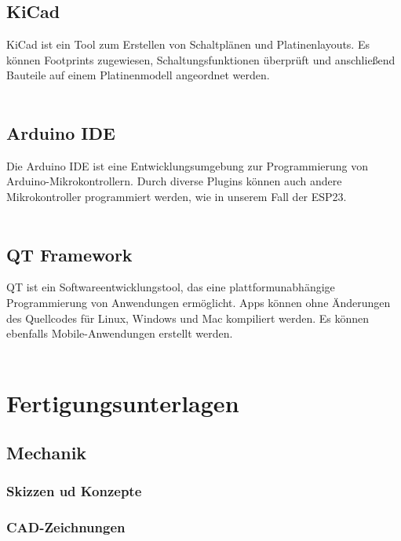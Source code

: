 \documentclass[titlepage,12pt,twoside]{article}
\begin{document}
\subsection{KiCad}
\label{chap:KiCad}
KiCad ist ein Tool zum Erstellen von Schaltplänen und Platinenlayouts. Es können Footprints zugewiesen, Schaltungsfunktionen überprüft und anschließend Bauteile auf einem Platinenmodell angeordnet werden. \\
\\
\subsection{Arduino IDE}
\label{chap:Arduino IDE}
Die Arduino IDE ist eine Entwicklungsumgebung zur Programmierung von Arduino-Mikrokontrollern. Durch diverse Plugins können auch andere Mikrokontroller programmiert werden, wie in unserem Fall der ESP23. \\
\\
\subsection{QT Framework}
\label{chap:QT Framework}
QT ist ein Softwareentwicklungstool, das eine plattformunabhängige Programmierung von Anwendungen ermöglicht. Apps können ohne Änderungen des Quellcodes für Linux, Windows und Mac kompiliert werden. Es können ebenfalls Mobile-Anwendungen
erstellt werden. \\
\\
\newpage
\section{Fertigungsunterlagen}
\label{chap:Fertigungsunterlagen}
\subsection{Mechanik}
\label{chap:Fertigungsunterlagen_Mechanik}
\subsubsection{Skizzen ud Konzepte}

\subsubsection{CAD-Zeichnungen}
\end{document}
